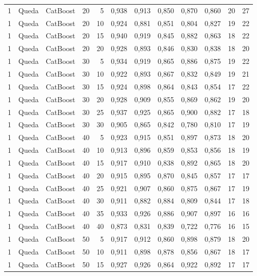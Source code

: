 \begin{longtable}{@{}rllrrrrrrrrr@{}}
1 & Queda & CatBoost & 20 & 5 & 0,938 & 0,913 & 0,850 & 0,870 & 0,860 & 20 & 27 \\
1 & Queda & CatBoost & 20 & 10 & 0,924 & 0,881 & 0,851 & 0,804 & 0,827 & 19 & 22 \\
1 & Queda & CatBoost & 20 & 15 & 0,940 & 0,919 & 0,845 & 0,882 & 0,863 & 18 & 22 \\
1 & Queda & CatBoost & 20 & 20 & 0,928 & 0,893 & 0,846 & 0,830 & 0,838 & 18 & 20 \\
1 & Queda & CatBoost & 30 & 5 & 0,934 & 0,919 & 0,865 & 0,886 & 0,875 & 19 & 22 \\
1 & Queda & CatBoost & 30 & 10 & 0,922 & 0,893 & 0,867 & 0,832 & 0,849 & 19 & 21 \\
1 & Queda & CatBoost & 30 & 15 & 0,924 & 0,898 & 0,864 & 0,843 & 0,854 & 17 & 22 \\
1 & Queda & CatBoost & 30 & 20 & 0,928 & 0,909 & 0,855 & 0,869 & 0,862 & 19 & 20 \\
1 & Queda & CatBoost & 30 & 25 & 0,937 & 0,925 & 0,865 & 0,900 & 0,882 & 17 & 18 \\
1 & Queda & CatBoost & 30 & 30 & 0,905 & 0,865 & 0,842 & 0,780 & 0,810 & 17 & 19 \\
1 & Queda & CatBoost & 40 & 5 & 0,923 & 0,915 & 0,851 & 0,897 & 0,873 & 18 & 20 \\
1 & Queda & CatBoost & 40 & 10 & 0,913 & 0,896 & 0,859 & 0,853 & 0,856 & 18 & 19 \\
1 & Queda & CatBoost & 40 & 15 & 0,917 & 0,910 & 0,838 & 0,892 & 0,865 & 18 & 20 \\
1 & Queda & CatBoost & 40 & 20 & 0,915 & 0,895 & 0,870 & 0,845 & 0,857 & 17 & 17 \\
1 & Queda & CatBoost & 40 & 25 & 0,921 & 0,907 & 0,860 & 0,875 & 0,867 & 17 & 19 \\
1 & Queda & CatBoost & 40 & 30 & 0,911 & 0,882 & 0,884 & 0,809 & 0,844 & 17 & 18 \\
1 & Queda & CatBoost & 40 & 35 & 0,933 & 0,926 & 0,886 & 0,907 & 0,897 & 16 & 16 \\
1 & Queda & CatBoost & 40 & 40 & 0,873 & 0,831 & 0,839 & 0,722 & 0,776 & 16 & 15 \\
1 & Queda & CatBoost & 50 & 5 & 0,917 & 0,912 & 0,860 & 0,898 & 0,879 & 18 & 20 \\
1 & Queda & CatBoost & 50 & 10 & 0,911 & 0,898 & 0,878 & 0,856 & 0,867 & 18 & 17 \\
1 & Queda & CatBoost & 50 & 15 & 0,927 & 0,926 & 0,864 & 0,922 & 0,892 & 17 & 17 \\

\end{longtable}

